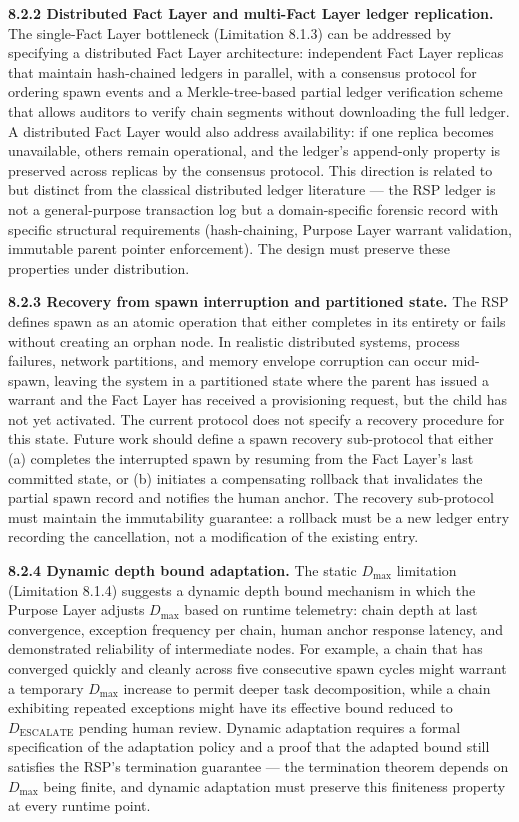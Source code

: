 \medskip
\noindent\textbf{8.2.2  Distributed Fact Layer and multi-Fact Layer ledger replication.}
The single-Fact Layer bottleneck (Limitation 8.1.3) can be addressed by specifying a distributed Fact Layer architecture: independent Fact Layer replicas that maintain hash-chained ledgers in parallel, with a consensus protocol for ordering spawn events and a Merkle-tree-based partial ledger verification scheme that allows auditors to verify chain segments without downloading the full ledger. A distributed Fact Layer would also address availability: if one replica becomes unavailable, others remain operational, and the ledger's append-only property is preserved across replicas by the consensus protocol. This direction is related to but distinct from the classical distributed ledger literature — the RSP ledger is not a general-purpose transaction log but a domain-specific forensic record with specific structural requirements (hash-chaining, Purpose Layer warrant validation, immutable parent pointer enforcement). The design must preserve these properties under distribution.

\medskip
\noindent\textbf{8.2.3  Recovery from spawn interruption and partitioned state.}
The RSP defines spawn as an atomic operation that either completes in its entirety or fails without creating an orphan node. In realistic distributed systems, process failures, network partitions, and memory envelope corruption can occur mid-spawn, leaving the system in a partitioned state where the parent has issued a warrant and the Fact Layer has received a provisioning request, but the child has not yet activated. The current protocol does not specify a recovery procedure for this state. Future work should define a spawn recovery sub-protocol that either (a) completes the interrupted spawn by resuming from the Fact Layer's last committed state, or (b) initiates a compensating rollback that invalidates the partial spawn record and notifies the human anchor. The recovery sub-protocol must maintain the immutability guarantee: a rollback must be a new ledger entry recording the cancellation, not a modification of the existing entry.

\medskip
\noindent\textbf{8.2.4  Dynamic depth bound adaptation.}
The static $D_{\max}$ limitation (Limitation 8.1.4) suggests a dynamic depth bound mechanism in which the Purpose Layer adjusts $D_{\max}$ based on runtime telemetry: chain depth at last convergence, exception frequency per chain, human anchor response latency, and demonstrated reliability of intermediate nodes. For example, a chain that has converged quickly and cleanly across five consecutive spawn cycles might warrant a temporary $D_{\max}$ increase to permit deeper task decomposition, while a chain exhibiting repeated exceptions might have its effective bound reduced to $D_{\mathrm{ESCALATE}}$ pending human review. Dynamic adaptation requires a formal specification of the adaptation policy and a proof that the adapted bound still satisfies the RSP's termination guarantee — the termination theorem depends on $D_{\max}$ being finite, and dynamic adaptation must preserve this finiteness property at every runtime point.

